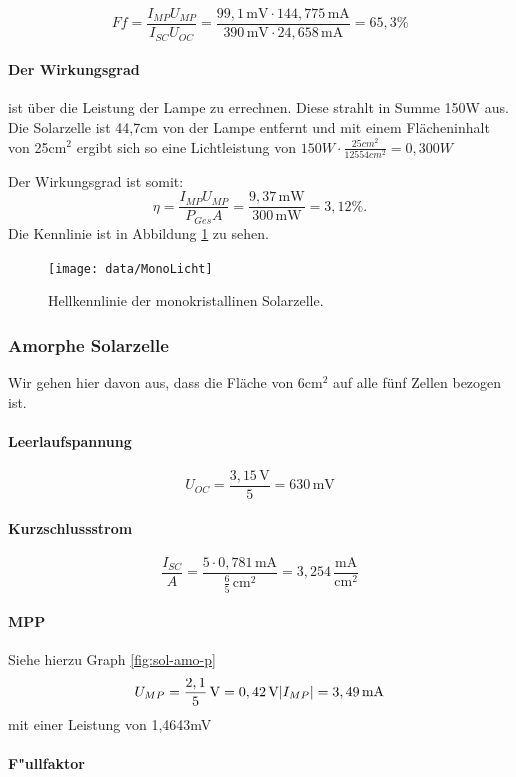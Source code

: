 $$    Ff=\frac{I_{MP}U_{MP}}{I_{SC}U_{OC}}=\frac{99,1\,\text{mV}\cdot144,775\,\text{mA}}{390\,\text{mV}\cdot24,658\,\text{mA}}=65,3\%   $$

\paragraph{Der Wirkungsgrad} ist über die Leistung der Lampe zu errechnen. Diese strahlt in Summe 150W aus. Die Solarzelle ist 44,7cm von der Lampe entfernt und mit einem Flächeninhalt von 25cm$^2$ ergibt sich so eine Lichtleistung von $150W\cdot\frac{25cm^2}{12554cm^2}=0,300W$

Der Wirkungsgrad ist somit:
$$
\eta=\frac{I_{MP}U_{MP}}{P_{Ges}A}=\frac{9,37\,\text{mW}}{300\,\text{mW}}=3,12\%.
$$
Die Kennlinie ist in Abbildung \ref{fig:monokrishell} zu sehen.\\

\begin{figure}[t!]
    \centering
    \texttt{[image: data/MonoLicht]}
    \caption{Hellkennlinie der monokristallinen Solarzelle.}
    \label{fig:monokrishell}
\end{figure}


\subsubsection{Amorphe Solarzelle}
Wir gehen hier davon aus, dass die Fläche von 6cm$^2$ auf alle fünf Zellen bezogen ist.
\paragraph{Leerlaufspannung}
$$
    U_{OC} =\frac{3,15\,\text{V}}{5}=630\,\text{mV}
$$

\paragraph{Kurzschlussstrom}
$$ \frac{I_{SC}}{A}=\frac{5\cdot0,781\,\text{mA}}{\frac{6}{5}\,\text{cm}^2} =3,254\,\frac{\text{mA}}{\text{cm}^2 }$$

\paragraph{MPP} Siehe hierzu Graph \ref{fig:sol-amo-p}
$$
    U_{MP}=\frac{2,1}{5}\,\text{V}=0,42\,\text{V}\\
    \vert I_{MP}\vert=3,49\,\text{mA}
$$
mit einer Leistung von 1,4643mV

\paragraph{F"ullfaktor}

